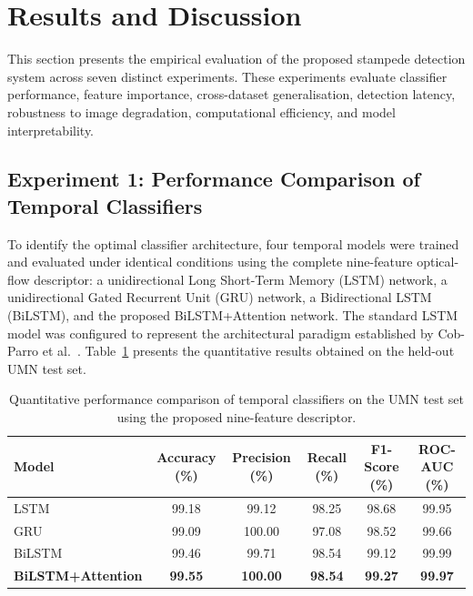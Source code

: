 \section{Results and Discussion}

This section presents the empirical evaluation of the proposed stampede detection system across seven distinct experiments. These experiments evaluate classifier performance, feature importance, cross-dataset generalisation, detection latency, robustness to image degradation, computational efficiency, and model interpretability.

\subsection{Experiment 1: Performance Comparison of Temporal Classifiers}

To identify the optimal classifier architecture, four temporal models were trained and evaluated under identical conditions using the complete nine-feature optical-flow descriptor: a unidirectional Long Short-Term Memory (LSTM) network, a unidirectional Gated Recurrent Unit (GRU) network, a Bidirectional LSTM (BiLSTM), and the proposed BiLSTM+Attention network. The standard LSTM model was configured to represent the architectural paradigm established by Cob-Parro et al.\ \cite{cobparro2021stampede}. Table~\ref{tab:model_comparison} presents the quantitative results obtained on the held-out UMN test set.

\begin{table}[!t]
\centering
\caption{Quantitative performance comparison of temporal classifiers on the UMN test set using the proposed nine-feature descriptor.}
\label{tab:model_comparison}
\footnotesize
\begin{tabular}{lccccc}
\toprule
\textbf{Model} & \textbf{Accuracy (\%)} & \textbf{Precision (\%)} & \textbf{Recall (\%)} & \textbf{F1-Score (\%)} & \textbf{ROC-AUC (\%)} \\
\midrule
LSTM             & 99.18 & 99.12 & 98.25 & 98.68 & 99.95 \\
GRU              & 99.09 & 100.00 & 97.08 & 98.52 & 99.66 \\
BiLSTM           & 99.46 & 99.71 & 98.54 & 99.12 & 99.99 \\
\textbf{BiLSTM+Attention} & \textbf{99.55} & \textbf{100.00} & \textbf{98.54} & \textbf{99.27} & \textbf{99.97} \\
\bottomrule
\end{tabular}
\end{table}


